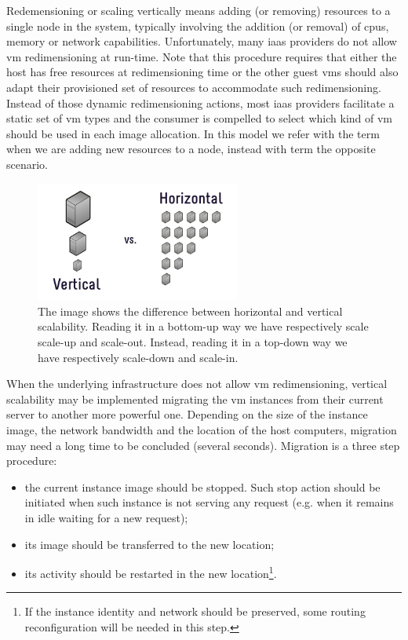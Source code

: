 Redemensioning or scaling vertically means adding (or removing) resources to a single node in the system,
typically involving the addition (or removal) of \acs{cpu}s, memory or network capabilities. Unfortunately,
many \ac{iaas} providers do not allow \ac{vm} redimensioning at run-time. Note that this procedure requires
that either the host has free resources at redimensioning time or the other guest \ac{vm}s should also adapt
their provisioned set of resources to accommodate such redimensioning. Instead of those dynamic redimensioning
actions, most \ac{iaas} providers facilitate a static set of \ac{vm} types and the consumer is compelled 
to select which kind of \ac{vm} should be used in each image allocation. In this model we refer with the term
 when we are adding new resources to a node, instead with term  the
opposite scenario.

\begin{figure}
	\centering{}
	\includegraphics[width=0.6\textwidth]{chapters/elasticity/images/horizontal-vs-vertical-scaling.png}
	\caption[Difference between horizontal and vertical scalability]{The image shows the difference between
		horizontal and vertical scalability. Reading it in a bottom-up way we have respectively scale scale-up
		and scale-out. Instead, reading it in a top-down way we have respectively scale-down and scale-in.}
	\label{img:solutionSpace-elasticity-availableTypes}
\end{figure}

When the underlying infrastructure does not allow \ac{vm} redimensioning, vertical scalability may be
implemented migrating the \ac{vm} instances from their current server to another more powerful one.
Depending on the size of the instance image, the network bandwidth and the location of
the host computers, migration may need a long time to be concluded (several seconds). Migration is a
three step procedure:

\begin{itemize}
	\item{the current instance image should be stopped. Such stop action should be initiated when such
		instance is not serving any request (e.g. when it remains in idle waiting for a new request);}
	\item{its image should be transferred to the new location;}
	\item{its activity should be restarted in the new location\footnote{If the instance identity and
		network should be preserved, some routing reconfiguration will be needed in this step.}.}
\end{itemize}

